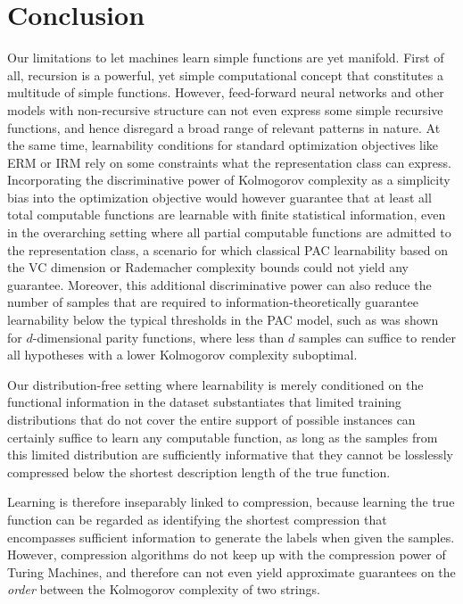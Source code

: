 
\chapter{Conclusion}
\label{chap:conclusion}
Our limitations to let machines learn simple functions are yet manifold.
First of all, recursion is a powerful, yet simple computational concept that constitutes a multitude of simple functions.
However, feed-forward neural networks and other models with non-recursive structure can not even express some simple recursive functions, and hence disregard a broad range of relevant patterns in nature.
At the same time, learnability conditions for standard optimization objectives like ERM or IRM rely on some constraints what the representation class can express.
Incorporating the discriminative power of Kolmogorov complexity as a simplicity bias into the optimization objective would however guarantee that at least all total computable functions are learnable with finite statistical information, even in the overarching setting where all partial computable functions are admitted to the representation class, a scenario for which classical PAC learnability based on the VC dimension or Rademacher complexity bounds could not yield any guarantee.
Moreover, this additional discriminative power can also reduce the number of samples that are required to information-theoretically guarantee learnability below the typical thresholds in the PAC model, such as was shown for $d$-dimensional parity functions, where less than $d$ samples can suffice to render all hypotheses with a lower Kolmogorov complexity suboptimal.

Our distribution-free setting where learnability is merely conditioned on the functional information in the dataset substantiates that limited training distributions that do not cover the entire support of possible instances can certainly suffice to learn any computable function, as long as the samples from this limited distribution are sufficiently informative that they cannot be losslessly compressed below the shortest description length of the true function.

Learning is therefore inseparably linked to compression, because learning the true function can be regarded as identifying the shortest compression that encompasses sufficient information to generate the labels when given the samples.
However, compression algorithms do not keep up with the compression power of Turing Machines, and therefore can not even yield approximate guarantees on the \textit{order} between the Kolmogorov complexity of two strings.

